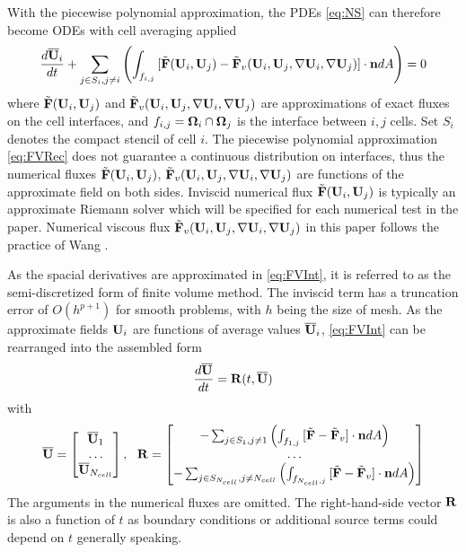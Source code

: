\documentclass[preprint,12pt]{elsarticle}
\begin{document}
With the piecewise polynomial approximation,
the PDEs \eqref{eq:NS} can therefore become ODEs
with cell averaging applied
\begin{equation}
    \label{eq:FVInt}
    \frac{d\overline{\mathbf{U}}_i}{dt}
    +\sum_{j\in S_i, j\neq i}{\left(
        \int_{f_{i,j}}{
            [\tilde{\mathbf{F}}(\mathbf{U}_i,\mathbf{U}_j) - \tilde{\mathbf{F}}_v(\mathbf{U}_i,\mathbf{U}_j, \nabla \mathbf{U}_i, \nabla \mathbf{U}_j)] \cdot \mathbf{n}  dA
        }\right)
    }
    = 0
\end{equation}
where $\tilde{\mathbf{F}}(\mathbf{U}_i,\mathbf{U}_j)$ and $\tilde{\mathbf{F}}_v(\mathbf{U}_i,\mathbf{U}_j, \nabla \mathbf{U}_i, \nabla \mathbf{U}_j)$ are approximations
of exact fluxes on the cell interfaces,
and $f_{i,j}=\mathbf{\Omega}_i \cap \mathbf{\Omega}_j$ is the interface between $i,j$ cells.
Set $S_i$ denotes the compact stencil of cell $i$.
The piecewise polynomial approximation \eqref{eq:FVRec} does not
guarantee a continuous distribution on interfaces,
thus the numerical fluxes
$\tilde{\mathbf{F}}(\mathbf{U}_i,\mathbf{U}_j)$, $\tilde{\mathbf{F}}_v(\mathbf{U}_i,\mathbf{U}_j, \nabla \mathbf{U}_i, \nabla \mathbf{U}_j)$ are
functions of the approximate field on both sides. Inviscid numerical
flux $\tilde{\mathbf{F}}(\mathbf{U}_i,\mathbf{U}_j)$ is typically an approximate Riemann solver which
will be specified for each numerical test in the paper.
Numerical viscous flux $\tilde{\mathbf{F}}_v(\mathbf{U}_i,\mathbf{U}_j, \nabla \mathbf{U}_i, \nabla \mathbf{U}_j)$
in this paper follows the practice of Wang \cite{wang2017compact_VR}.

As the spacial derivatives are approximated in \eqref{eq:FVInt},
it is referred to as the semi-discretized form of finite volume method.
The inviscid term has a truncation error of $O(h^{p+1})$ for smooth problems,
with $h$ being the size of mesh. As the approximate fields $\mathbf{U}_i$ are functions
of average values $\overline{\mathbf{U}}_i$, \eqref{eq:FVInt} can be rearranged into the
assembled form
\begin{equation}
    \label{eq:FVODE}
    \frac{d\overline{\mathbf{U}}}{dt} = \mathbf{R}(t, \overline{\mathbf{U}})
\end{equation}
with
\begin{equation}
    \overline{\mathbf{U}} = \begin{bmatrix}
        \overline{\mathbf{U}}_1 \\
        \dots \\
        \overline{\mathbf{U}}_{N_{cell}}
    \end{bmatrix},\ \
    \mathbf{R} = \begin{bmatrix}
        -\sum_{j\in S_1, j\neq 1}{\left(
            \int_{f_{1,j}}{
                [\tilde{\mathbf{F}} - \tilde{\mathbf{F}}_v] \cdot \mathbf{n}  dA
            }\right)
        }     \\
        \dots \\
        -\sum_{j\in S_{N_{cell}}, j\neq N_{cell}}{\left(
            \int_{f_{N_{cell},j}}{
                [\tilde{\mathbf{F}} - \tilde{\mathbf{F}}_v] \cdot \mathbf{n}  dA
            }\right)
        }
    \end{bmatrix}
\end{equation}
The arguments in the numerical fluxes are omitted.
The right-hand-side vector $\mathbf{R}$ is also a function of $t$
as boundary conditions or additional source terms
could depend on $t$ generally speaking.
\end{document}
